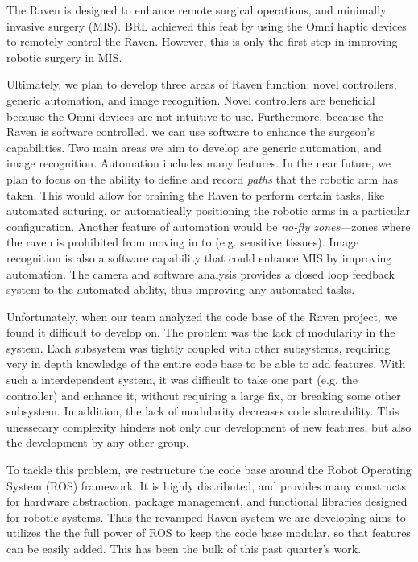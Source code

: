 \documentclass[letterpaper,twocolumn,10pt]{article}
\begin{document}
The Raven is designed to enhance remote surgical operations, and 
minimally invasive surgery (MIS). BRL achieved this feat by using the 
Omni haptic devices to remotely control the Raven. However, this is 
only the first step in improving robotic surgery in MIS.

Ultimately, we plan to develop three areas of Raven function: novel
controllers, generic automation, and image recognition. Novel
controllers are beneficial because the Omni devices are not intuitive
to use.  Furthermore, because the Raven is software controlled, we can
use software to enhance the surgeon's capabilities. Two main areas we
aim to develop are generic automation, and image recognition.
Automation includes many features. In the near future, we plan to
focus on the ability to define and record \emph{paths} that the
robotic arm has taken. This would allow for training the Raven to
perform certain tasks, like automated suturing, or automatically
positioning the robotic arms in a particular configuration. Another
feature of automation would be \emph{no-fly zones}---zones where the
raven is prohibited from moving in to (e.g. sensitive tissues).  Image
recognition is also a software capability that could enhance MIS by
improving automation. The camera and software analysis provides a
closed loop feedback system to the automated ability, thus improving
any automated tasks.

Unfortunately, when our team analyzed the code base of the Raven 
project, we found it difficult to develop on. The problem was the lack 
of modularity in the system. Each subsystem was tightly coupled with 
other subsystems, requiring very in depth knowledge of the entire 
code base to be able to add features. With such a interdependent 
system, it was difficult to take one part (e.g. the controller) and 
enhance it, without requiring a large fix, or breaking some other 
subsystem. In addition, the lack of modularity decreases code 
shareability. This unessecary complexity hinders not only our 
development of new features, but also the development by any other 
group.

To tackle this problem, we restructure the code base around the Robot
Operating System (ROS) framework. It is highly distributed, and 
provides many constructs for hardware abstraction, package management, 
and functional libraries designed for robotic systems. Thus the 
revamped Raven system we are developing aims to utilizes the the full 
power  of ROS to keep the code base modular, so that features can be 
easily added. This has been the bulk of this past quarter's work.
\end{document}
